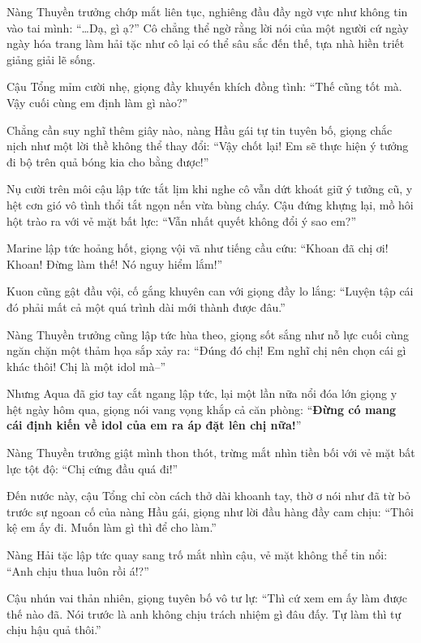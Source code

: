 \documentclass[../main.tex]{subfiles}
\begin{document}

Nàng Thuyền trưởng chớp mắt liên tục, nghiêng đầu đầy ngờ vực như không tin vào tai mình: ``\dots Dạ, gì ạ?'' Cô chẳng thể ngờ rằng lời nói của một người cứ ngày ngày hóa trang làm hải tặc như cô lại có thể sâu sắc đến thế, tựa nhà hiền triết giảng giải lẽ sống.

Cậu Tổng mỉm cười nhẹ, giọng đầy khuyến khích đồng tình: ``Thế cũng tốt mà. Vậy cuối cùng em định làm gì nào?''

Chẳng cần suy nghĩ thêm giây nào, nàng Hầu gái tự tin tuyên bố, giọng chắc nịch như một lời thề không thể thay đổi: ``Vậy chốt lại! Em sẽ thực hiện ý tưởng đi bộ trên quả bóng kia cho bằng được!''

Nụ cười trên môi cậu lập tức tắt lịm khi nghe cô vẫn dứt khoát giữ ý tưởng cũ, y hệt cơn gió vô tình thổi tắt ngọn nến vừa bùng cháy. Cậu đứng khựng lại, mồ hôi hột trào ra với vẻ mặt bất lực: ``Vẫn nhất quyết không đổi ý sao em?''

Marine lập tức hoảng hốt, giọng vội vã như tiếng cầu cứu: ``Khoan đã chị ơi! Khoan! Đừng làm thế! Nó nguy hiểm lắm!''

Kuon cũng gật đầu vội, cố gắng khuyên can với giọng đầy lo lắng: ``Luyện tập cái đó phải mất cả một quá trình dài mới thành được đâu.''

Nàng Thuyền trưởng cũng lập tức hùa theo, giọng sốt sắng như nỗ lực cuối cùng ngăn chặn một thảm họa sắp xảy ra: ``Đúng đó chị! Em nghĩ chị nên chọn cái gì khác thôi! Chị là một idol mà--''

Nhưng Aqua đã giơ tay cắt ngang lập tức, lại một lần nữa nổi đóa lớn giọng y hệt ngày hôm qua, giọng nói vang vọng khắp cả căn phòng: ``\textbf{Đừng có mang cái định kiến về idol của em ra áp đặt lên chị nữa!}''

Nàng Thuyền trưởng giật mình thon thót, trừng mắt nhìn tiền bối với vẻ mặt bất lực tột độ: ``Chị cứng đầu quá đi!''

Đến nước này, cậu Tổng chỉ còn cách thở dài khoanh tay, thờ ơ nói như đã từ bỏ trước sự ngoan cố của nàng Hầu gái, giọng như lời đầu hàng đầy cam chịu: ``Thôi kệ em ấy đi. Muốn làm gì thì để cho làm.''

Nàng Hải tặc lập tức quay sang trố mắt nhìn cậu, vẻ mặt không thể tin nổi: ``Anh chịu thua luôn rồi á!?''

Cậu nhún vai thản nhiên, giọng tuyên bố vô tư lự: ``Thì cứ xem em ấy làm được thế nào đã. Nói trước là anh không chịu trách nhiệm gì đâu đấy. Tự làm thì tự chịu hậu quả thôi.''
\end{document}
